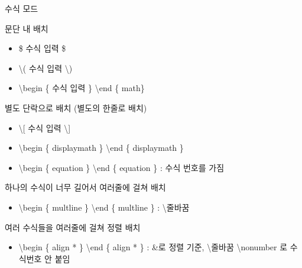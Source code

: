 \documentclass[ aspectratio=149,  14pt,blue,xcolor=pdftex,dvipsnames,table,handout,notes]{beamer}
\begin{document}
		\begin{frame}[t, shrink=5]{수식 모드}

			\begin{block} {문단 내 배치}
				\begin{itemize}
				\item[]  \$ 수식 입력  \$
				\item[]  \textbackslash ( 수식 입력  \textbackslash )
				\item[]  \textbackslash begin \{ 수식 입력  \} \textbackslash end \{ math\}
				\end{itemize}
			\end{block}

			\begin{block} {별도 단락으로 배치 (별도의 한줄로 배치) }
				\begin{itemize}
				\item[]  \textbackslash [ 수식 입력 \textbackslash ]
				\item[]  \textbackslash begin \{ displaymath \} \textbackslash end \{ displaymath \}
				\item[]  \textbackslash begin \{ equation \} \textbackslash end \{ equation \} : 수식 번호를 가짐
				\end{itemize}
			\end{block}

			\begin{block} {하나의 수식이 너무 길어서 여러줄에 걸쳐 배치}
				\begin{itemize}
				\item[]  \textbackslash begin \{ multline \}  \textbackslash end \{ multline \}  : 
						\textbackslash {} 줄바꿈
				\end{itemize}
			\end{block}

			\begin{block} {여러 수식들을 여러줄에 걸쳐 정렬 배치}
				\begin{itemize}
				\item[]  \textbackslash begin \{ align * \}  \textbackslash end \{ align * \}
						: \&로 정렬 기준, \textbackslash {} 줄바꿈
						\textbackslash nonumber 로 수식번호 안 붙임
				\end{itemize}
			\end{block}

		
		\end{frame}
\end{document}
